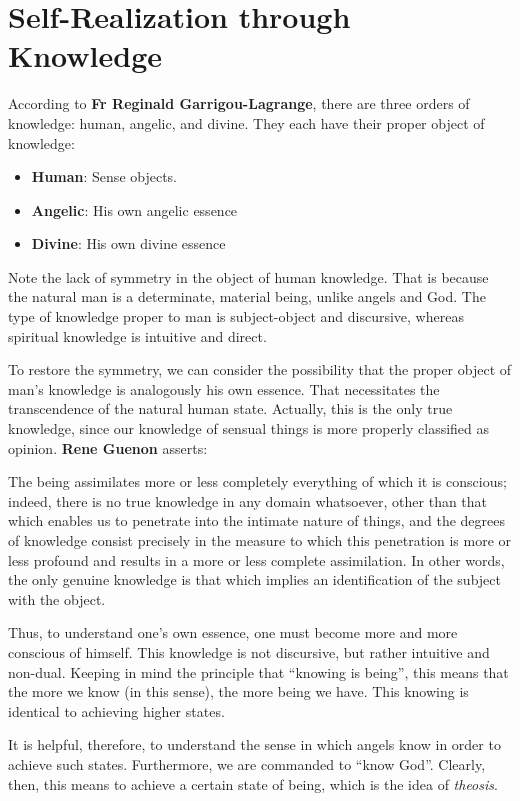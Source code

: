 \section{Self-Realization through Knowledge}

According to \textbf{Fr Reginald Garrigou-Lagrange}, there are three orders of knowledge: human, angelic, and divine. They each have their proper object of knowledge:

\begin{itemize}
\item \textbf{Human}: Sense objects. 
\item \textbf{Angelic}: His own angelic essence 
\item \textbf{Divine}: His own divine essence 
\end{itemize}
Note the lack of symmetry in the object of human knowledge. That is because the natural man is a determinate, material being, unlike angels and God. The type of knowledge proper to man is subject-object and discursive, whereas spiritual knowledge is intuitive and direct.

To restore the symmetry, we can consider the possibility that the proper object of man's knowledge is analogously his own essence. That necessitates the transcendence of the natural human state. Actually, this is the only true knowledge, since our knowledge of sensual things is more properly classified as opinion. \textbf{Rene Guenon} asserts:

\begin{quotex}
The being assimilates more or less completely everything of which it is conscious; indeed, there is no true knowledge in any domain whatsoever, other than that which enables us to penetrate into the intimate nature of things, and the degrees of knowledge consist precisely in the measure to which this penetration is more or less profound and results in a more or less complete assimilation. In other words, the only genuine knowledge is that which implies an identification of the subject with the object.

\end{quotex}
Thus, to understand one's own essence, one must become more and more conscious of himself. This knowledge is not discursive, but rather intuitive and non-dual. Keeping in mind the principle that “knowing is being”, this means that the more we know (in this sense), the more being we have. This knowing is identical to achieving higher states.

It is helpful, therefore, to understand the sense in which angels know in order to achieve such states. Furthermore, we are commanded to “know God”. Clearly, then, this means to achieve a certain state of being, which is the idea of \emph{theosis}.

